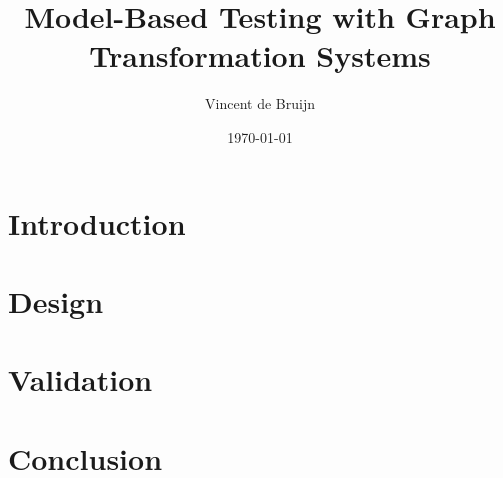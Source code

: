 \documentclass[a4paper]{report}
\theoremstyle{definition}
\begin{document}
	\title{\textbf{Model-Based Testing with Graph Transformation Systems}}
	\author{Vincent de Bruijn}
	\date{\today}
	\maketitle
	
	
	
	\newpage
	\tableofcontents
  \newpage
  
  \newpage
	\chapter{Introduction}
	\newpage
	
	\newpage
	\chapter{Design}
	
	\newpage
	
	
	
	
	
	
	
	\newpage
	\chapter{Validation}
	
	\newpage
	
	
	

	\newpage
	\chapter{Conclusion}
	\newpage
	
	
	
	

  \newpage
	{}
	
	
	\appendix
  \newpage
\end{document}
